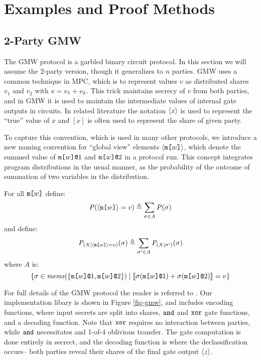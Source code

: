 \section{Examples and Proof Methods}
\label{section-examples}

\subsection{2-Party GMW}
\label{section-metalang-gmw}



The GMW protocol is a garbled binary circuit protocol. In this section
we will assume the 2-party version, though it generalizes to $n$
parties\cite{XXX}. GMW uses a common technique in MPC, which is to
represent values $v$ as distributed shares $v_1$ and $v_2$ with
$v = v_1 + v_2$. This trick maintains secrecy of $v$
from both parties, and in GMW it is used to maintain the intermediate
values of internal gate outputs in circuits. In related literature
the notation $\langle x \rangle$ is used to represent the ``true''
value of $x$ and $[x]$ is often used to represent the share of
given party.

To capture this convention, which is used in many other protocols, we
introduce a new naming convention for ``global view'' elements
$\langle \texttt{m[}w\texttt{]} \rangle$, which denote the summed value of
$\texttt{m[}w\texttt{]}\texttt{@}1$ and $\texttt{m[}w\texttt{]}\texttt{@}2$ in a protocol
run. This concept integrates program distributions in the
usual manner, as the probability of the outcome of summation
of two variables in the distribution.
\begin{definition}
  For all $\texttt{m[}w\texttt{]}$ define:
  $$\mathit{P}(\langle \texttt{m[}w\texttt{]} \rangle = v) \triangleq \sum_{\sigma \in A} \mathit{P}(\sigma)$$
  and define:
  $$\mathit{P}_{({X}|{\langle \texttt{m[}w\texttt{]} \rangle = v})}(\sigma) \triangleq  \sum_{\sigma' \in A} \mathit{P}_{({X}|{\sigma'})}(\sigma)$$
  where $A$ is:
  $$\{ \sigma \in \mathit{mems}(\{ \texttt{m[}w\texttt{]}\texttt{@}1,\texttt{m[}w\texttt{]}\texttt{@}2 \} ) \mid
      \llbracket \sigma(\texttt{m[}w\texttt{]}\texttt{@}1) + \sigma(\texttt{m[}w\texttt{]}\texttt{@}2) \rrbracket_{} = v \}$$
\end{definition}

For full details of the GMW protocol the reader is referred to
\cite{evans2018pragmatic}. Our implementation libary is shown in
Figure \ref{fig-gmw}, and includes encoding functions, where
input secrets are split into shares, $\texttt{and}$ and $\texttt{xor}$ gate
functions, and a decoding function. Note that $\texttt{xor}$ requires
no interaction between parties, while $\texttt{and}$ necessitates and
1-of-4 oblivious transfer. The gate computation is
done entirely in secrect, and the decoding function
is where the declassification occurs-- both parties reveal
their shares of the final gate output $\langle z \rangle$.

